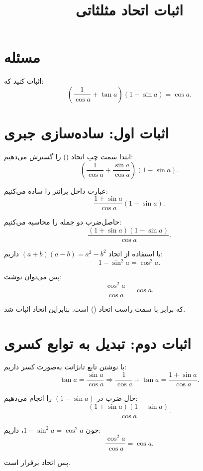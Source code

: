 \documentclass{article}
\begin{document}
\title{اثبات اتحاد مثلثاتی}
\author{}
\date{}
\maketitle

\section*{مسئله}
اثبات کنید که:
\begin{equation}
    \left(\frac{1}{\cos a} + \tan a\right)(1 - \sin a) = \cos a.
\end{equation}

\section*{اثبات اول: ساده‌سازی جبری}

ابتدا سمت چپ اتحاد () را گسترش می‌دهیم:
\begin{equation}
    \left(\frac{1}{\cos a} + \frac{\sin a}{\cos a}\right)(1 - \sin a).
\end{equation}

عبارت داخل پرانتز را ساده می‌کنیم:
\begin{equation}
    \frac{1 + \sin a}{\cos a} (1 - \sin a).
\end{equation}

حاصل‌ضرب دو جمله را محاسبه می‌کنیم:
\begin{equation}
    \frac{(1 + \sin a)(1 - \sin a)}{\cos a}.
\end{equation}

با استفاده از اتحاد $(a+b)(a-b) = a^2 - b^2$ داریم:
\begin{equation}
    1 - \sin^2 a = \cos^2 a.
\end{equation}

پس می‌توان نوشت:
\begin{equation}
    \frac{\cos^2 a}{\cos a} = \cos a.
\end{equation}

که برابر با سمت راست اتحاد () است. بنابراین اتحاد اثبات شد.

\section*{اثبات دوم: تبدیل به توابع کسری}

با نوشتن تابع تانژانت به‌صورت کسر داریم:
\begin{equation}
    \tan a = \frac{\sin a}{\cos a} \Rightarrow \frac{1}{\cos a} + \tan a = \frac{1 + \sin a}{\cos a}.
\end{equation}

حال ضرب در $(1 - \sin a)$ را انجام می‌دهیم:
\begin{equation}
    \frac{(1 + \sin a)(1 - \sin a)}{\cos a}.
\end{equation}

چون $1 - \sin^2 a = \cos^2 a$، داریم:
\begin{equation}
    \frac{\cos^2 a}{\cos a} = \cos a.
\end{equation}

پس اتحاد برقرار است.
\end{document}
